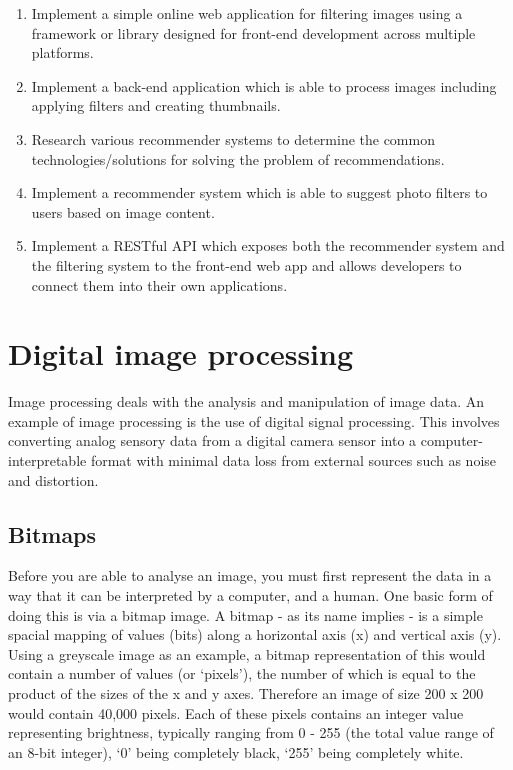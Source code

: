 \documentclass[a4paper,12pt]{report}
\begin{document}
    \begin{enumerate}
      \item \label{obj1}Implement a simple online web application for filtering images using a framework or library designed for front-end development across multiple platforms.
      \item \label{obj2}Implement a back-end application which is able to process images including applying filters and creating thumbnails.
      \item \label{obj3}Research various recommender systems to determine the common technologies/solutions for solving the problem of recommendations.
      \item \label{obj4}Implement a recommender system which is able to suggest photo filters to users based on image content.
      \item \label{obj5}Implement a RESTful API which exposes both the recommender system and the filtering system to the front-end web app and allows developers to connect them into their own applications.
    \end{enumerate}

  \section{Digital image processing}
   Image processing deals with the analysis and manipulation of image data. An example of image processing is the use of digital signal processing. This involves converting analog sensory data from a digital camera sensor into a computer-interpretable format with minimal data loss from external sources such as noise and distortion.\\

   \subsection{Bitmaps}
     Before you are able to analyse an image, you must first represent the data in a way that it can be interpreted by a computer, and a human. One basic form of doing this is via a bitmap image. A bitmap - as its name implies - is a simple spacial mapping of values (bits) along a horizontal axis (x) and vertical axis (y). Using a greyscale image as an example, a bitmap representation of this would contain a number of values (or ‘pixels’), the number of which is equal to the product of the sizes of the x and y axes. Therefore an image of size 200 x 200 would contain 40,000 pixels. Each of these pixels contains an integer value representing brightness, typically ranging from 0 - 255 (the total value range of an 8-bit integer), ‘0’ being completely black, ‘255’ being completely white.
\end{document}
